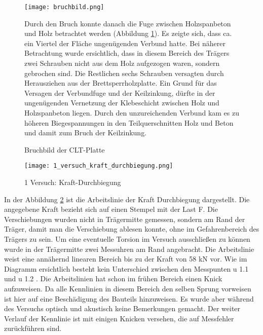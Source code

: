 \documentclass[12 pt,a4 paper ]{scrreprt}
\begin{document}
\begin{figure}
\begin{minipage}[hbt]{5cm}
	\texttt{[image: bruchbild.png]}
	\caption{Bruchbild der CLT-Platte }
	\label{bruchbild}
\end{minipage}
\hfill
\begin{minipage}[hbt]{7cm}
Durch den Bruch konnte danach die Fuge zwischen Holzspanbeton und Holz betrachtet werden (Abbildung \ref{bruchbild}). Es zeigte sich, dass ca. ein Viertel der Fläche ungenügenden Verbund hatte. Bei näherer Betrachtung wurde ersichtlich, dass in diesem Bereich des Trägers zwei Schrauben nicht aus dem Holz aufgezogen waren, sondern gebrochen sind. Die Restlichen sechs Schrauben versagten durch Herausziehen aus der Brettsperrholzplatte. Ein Grund für das Versagen der Verbundfuge und der Keilzinkung, dürfte in der ungenügenden Vernetzung der Klebeschicht zwischen Holz und Holzspanbeton liegen. Durch den unzureichenden Verbund kam es zu höheren Biegespannungen in den Teilquerschnitten Holz und Beton und damit zum Bruch der Keilzinkung.
\end{minipage}
\end{figure}


\clearpage

\begin{figure}
\begin{center}
\texttt{[image: 1\_versuch\_kraft\_durchbiegung.png]}
\caption{1 Versuch: Kraft-Durchbiegung}
\label{1 Versuch: Kraft-Durchbiegung}
\end{center}
\end{figure}
In der Abbildung \ref{1 Versuch: Kraft-Durchbiegung} ist die Arbeitslinie der Kraft Durchbiegung dargestellt. Die angegebene Kraft bezieht sich auf einen Stempel mit der Last F. Die Verschiebungen wurden nicht in Trägermitte gemessen, sondern am Rand der Träger, damit man die Verschiebung ablesen konnte, ohne im Gefahrenbereich des Trägers zu sein. Um eine eventuelle Torsion im Versuch ausschließen zu können wurde in der Trägermitte zwei Messuhren am Rand angebracht. Die Arbeitslinie weist eine annähernd linearen Bereich bis zu der Kraft von 58 kN vor. Wie im Diagramm ersichtlich besteht kein Unterschied zwischen den Messpunten u 1.1 und u 1.2 . Die Arbeitslinien hat schon im frühen Bereich einen Knick aufzuweisen. Da alle Kennlinien in diesem Bereich den selben Sprung vorweisen ist hier auf eine Beschädigung des Bauteils hinzuweisen. Es wurde aber während des Versuchs optisch und akustisch keine Bemerkungen gemacht. Der weiter Verlauf der Kennlinie ist mit einigen Knicken versehen, die auf Messfehler zurückführen sind. 
\end{document}
